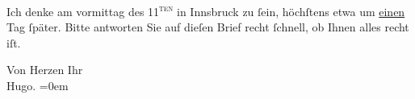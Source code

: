 \pstart
           Ich denke am vormittag des 11\textsuperscript{\textsc{ten}} in Innsbruck zu ſein, höchſtens etwa um
                  \uline{einen} Tag ſpäter. Bitte antworten Sie auf dieſen
               Brief recht ſchnell, ob Ihnen alles recht iſt.\pend
           
\pstart
           Von Herzen Ihr{\\[\baselineskip]}\spacefill\mbox{Hugo.}\pend
           \leftskip=0em{}\endnumbering{}  
      